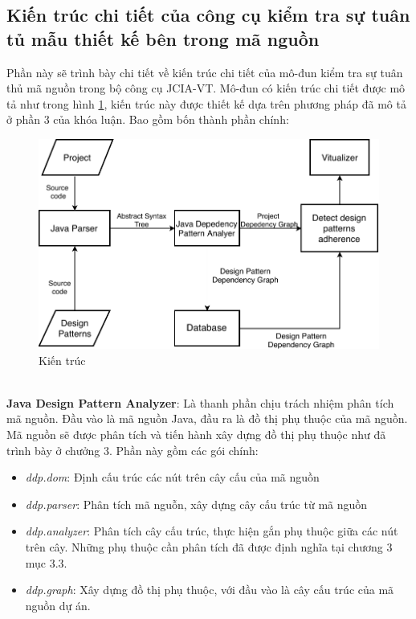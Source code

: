 \documentclass[12pt]{report}
\begin{document}
\subsection{Kiến trúc chi tiết của công cụ kiểm tra sự tuân tủ mẫu thiết kế bên trong mã nguồn}
Phần này sẽ trình bày chi tiết về kiến trúc chi tiết của mô-đun kiểm tra sự tuân thủ mã nguồn trong bộ công cụ JCIA-VT. Mô-đun có kiến trúc chi tiết được mô tả như trong hình \ref{fig:detect_design_pattern_architexture}, kiến trúc này được thiết kế dựa trên phương pháp đã mô tả ở phần 3 của khóa luận. Bao gồm bốn thành phần chính:
\begin{figure}[!htbp]
	\centering
	\includegraphics[scale=0.35]{images/c4_architexture}
	\caption{Kiến trúc }
	\label{fig:detect_design_pattern_architexture}
\end{figure}\\
\noindent \textbf{Java Design Pattern Analyzer}: Là thanh phần chịu trách nhiệm phân tích mã nguồn. Đầu vào là mã nguồn Java, đầu ra là đồ thị phụ thuộc của mã nguồn. Mã nguồn sẽ được phân tích và tiến hành xây dựng đồ thị phụ thuộc như đã trình bày ở chưởng 3.  Phần này gồm các gói chính:
\begin{itemize}
	\item \textit{ddp.dom}: Định cấu trúc các nút trên cây cấu của mã nguồn
	\item \textit{ddp.parser}: Phân tích mã nguỗn, xây dựng cây cấu trúc từ mã nguồn
	\item \textit{ddp.analyzer}: Phân tích cây cấu trúc, thực hiện gắn phụ thuộc giữa các nút trên cây. Những phụ thuộc cần phân tích đã được định nghĩa tại chương 3 mục 3.3.
	\item \textit{ddp.graph}: Xây dựng đồ thị phụ thuộc, với đầu vào là cây cấu trúc của mã nguồn dự án.
\end{itemize}
\end{document}
